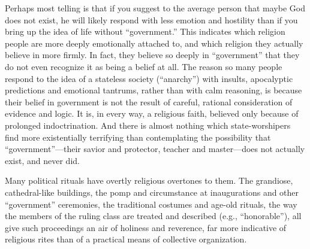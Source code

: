 \documentclass{book}
\begin{document}
Perhaps most telling is that if you suggest to the average person that maybe God does not exist, he will likely respond with less emotion and hostility than if you bring up the idea of life without \enquote{government.} This indicates which religion people are more deeply emotionally attached to, and which religion they actually believe in more firmly. In fact, they believe so deeply in \enquote{government} that they do not even recognize it as being a belief at all. The reason so many people respond to the idea of a stateless society (\enquote{anarchy}) with insults, apocalyptic predictions and emotional tantrums, rather than with calm reasoning, is because their belief in government is not the result of careful, rational consideration of evidence and logic. It is, in every way, a religious faith, believed only because of prolonged indoctrination. And there is almost nothing which state-worshipers find more existentially terrifying than contemplating the possibility that \enquote{government}---their savior and protector, teacher and master---does not actually exist, and never did.

Many political rituals have overtly religious overtones to them. The grandiose, cathedral-like buildings, the pomp and circumstance at inaugurations and other \enquote{government} ceremonies, the traditional costumes and age-old rituals, the way the members of the ruling class are treated and described (e.g., \enquote{honorable}), all give such proceedings an air of holiness and reverence, far more indicative of religious rites than of a practical means of collective organization.
\end{document}
